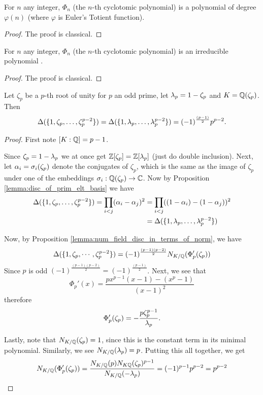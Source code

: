 \begin{lemma}\label{lemma:cyclo_poly_deg}
    \leanok
	For $n$ any integer, $\Phi_n$ (the $n$-th cyclotomic polynomial) is a polynomial of degree $\varphi(n)$ (where $\varphi$ is Euler's Totient function).
\end{lemma}
\begin{proof}
    \leanok
The proof is classical.
\end{proof}


\begin{lemma}\label{lemma:cyclo_poly_irr}
    \leanok
	For $n$ any integer, $\Phi_n$ (the $n$-th cyclotomic polynomial) is an irreducible polynomial .
\end{lemma}
\begin{proof}
    \leanok
The proof is classical.
\end{proof}

\begin{lemma}\label{lem:discr_of_cyclo}
	\leanok
	Let $\zeta_p$ be a $p$-th root of unity for $p$ an odd prime, let $\lambda_p=1-\zeta_p$ and $K=\mathbb{Q}(\zeta_p)$. Then \[\Delta(\{1,\zeta_p,\dots,\zeta_p^{p-2}\})=\Delta(\{1,\lambda_p,\dots,\lambda_p^{p-2}\})=(-1)^{\frac{(p-1)}{2}}p^{p-2}.\]
\end{lemma}
\begin{proof}
    \leanok
	First note $[K:\mathbb{Q}]=p-1$.

	Since $\zeta_p=1-\lambda_p$ we at once get $\mathbb{Z}[\zeta_p]=\mathbb{Z}[\lambda_p]$ (just do double inclusion). Next, let $\alpha_i=\sigma_i(\zeta_p)$ denote the conjugates of $\zeta_p$, which is the same as the image of $\zeta_p$ under one of the embeddings $\sigma_i: \mathbb{Q}(\zeta_p) \to \mathbb{C}$. Now  by Proposition \ref{lemma:disc_of_prim_elt_basis} we have \begin{align*}\Delta(\{1,\zeta_p,\dots,\zeta_p^{p-2}\})=\prod_{i < j}  (\alpha_i-\alpha_j)^2 &=\prod_{i < j}  ((1-\alpha_i)-(1-\alpha_j))^2\\&=\Delta(\{1,\lambda_p,\dots,\lambda_p^{p-2}\})\end{align*}

	Now, by Proposition \ref{lemma:num_field_disc_in_terms_of_norm}, we have \[\Delta(\{1,\zeta_p,\cdots,\zeta_p^{p-2}\})=(-1)^{\frac{(p-1)(p-2)}{2}}N_{K/\mathbb{Q}}(\Phi_p'(\zeta_p)  )\]
	Since $p$ is odd $(-1)^{\frac{(p-1)(p-2)}{2}}=(-1)^{\frac{(p-1)}{2}}$. Next, we see that \[\Phi_p'(x)=\frac{px^{p-1}(x-1)-(x^p-1)}{(x-1)^2}\] therefore \[\Phi_p'(\zeta_p)=-\frac{p\zeta_p^{p-1}}{\lambda_p}.\]

	Lastly, note that $N_{K/\mathbb{Q}}(\zeta_p)=1$, since this is the constant term in its minimal polynomial. Similarly, we see $N_{K/\mathbb{Q}}(\lambda_p)=p$. Putting this all together, we get \[N_{K/\mathbb{Q}}(\Phi_p'(\zeta_p)  )=\frac{N_{K/\mathbb{Q}}(p)N_{K\mathbb{Q}}(\zeta_p)^{p-1}}{N_{K/\mathbb{Q}}(-\lambda_p)}=(-1)^{p-1}p^{p-2}=p^{p-2}\]
\end{proof}


